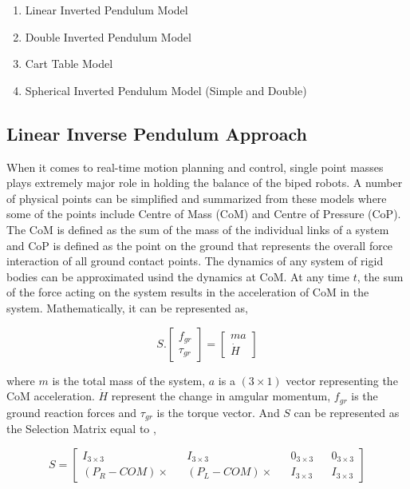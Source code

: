 \begin{enumerate}
    \item Linear Inverted Pendulum Model
    \item Double Inverted Pendulum Model
    \item Cart Table Model
    \item Spherical Inverted Pendulum Model (Simple and Double)
\end{enumerate}


\subsection{Linear Inverse Pendulum Approach}
\label{sec: LIPM}
When it comes to real-time motion planning and control, single point masses plays extremely major role in holding the balance of the biped robots. A number of physical points can be simplified and summarized from 
these models where some of the points include Centre of Mass (CoM) and Centre of Pressure (CoP). The CoM is defined as the sum of the mass of the individual links of a system and CoP is defined as the point on the 
ground that represents the overall force interaction of all ground contact points. The dynamics of any system of rigid bodies can be approximated usind the dynamics at CoM. At any time $t$, the sum of the force acting 
on the system results in the acceleration of CoM in the system. Mathematically, it can be represented as,


\begin{equation}
    \label{eq: scaling-pendulum}
    S.\begin{bmatrix}
        f_{gr} \\
        \tau_{gr}
    \end{bmatrix} = 
    \begin{bmatrix}
        ma \\
        \dot{H}
    \end{bmatrix}
\end{equation}


where $m$ is the total mass of the system, $a$ is a $(3 \times 1)$ vector representing the CoM acceleration. $\dot{H}$ represent the change in amgular momentum, $f_{gr}$ is the ground reaction forces and $\tau_{gr}$ is the torque vector. And $S$ can be represented as the 
Selection Matrix equal to \cite{elhasairi2015humanoid}, 


\begin{equation}
    S = \begin{bmatrix}
        I_{3 \times 3} && I_{3 \times 3} && 0_{3 \times 3} && 0_{3 \times 3} \\
        (P_R - COM)\times && (P_L - COM)\times && I_{3 \times 3} && I_{3 \times 3}
    \end{bmatrix}
\end{equation}

